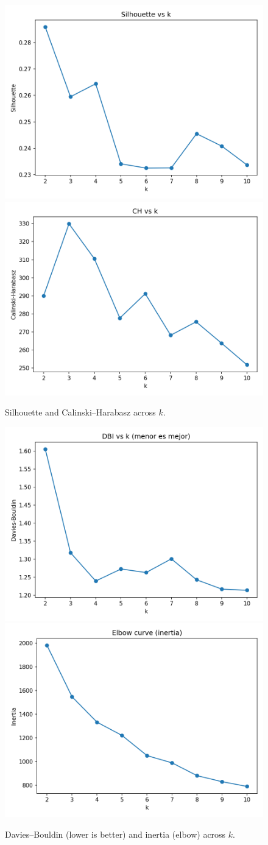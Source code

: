 \documentclass[journal]{IEEEtran}
\begin{document}
\begin{figure}[t]
	\centering
	\includegraphics[width=.48\linewidth]{assets/silhouette_vs_k.png}\hfill
	\includegraphics[width=.48\linewidth]{assets/ch_vs_k.png}
	\caption{Silhouette and Calinski--Harabasz across $k$.}
	\label{fig:silhouette-kmeans}\label{fig:ch-kmeans}
\end{figure}

\begin{figure}[t]
	\centering
	\includegraphics[width=.48\linewidth]{assets/dbi_vs_k.png}\hfill
	\includegraphics[width=.48\linewidth]{assets/elbow_inertia.png}
	\caption{Davies--Bouldin (lower is better) and inertia (elbow) across $k$.}
	\label{fig:dbi-kmeans}\label{fig:elbow-kmeans}
\end{figure}
\end{document}
